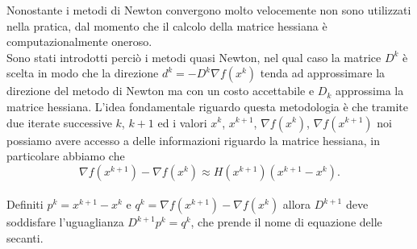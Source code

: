 \documentclass[a4paper, 12pt]{article}
\begin{document}
Nonostante i metodi di Newton convergono molto velocemente non sono utilizzati nella pratica, dal momento che il calcolo della matrice hessiana è computazionalmente oneroso. \\
Sono stati introdotti perciò i metodi quasi Newton, nel qual caso la matrice $D^k$ è scelta in modo che la direzione $d^k = -D^k\nabla f(x^k)$ tenda ad approssimare la direzione del metodo di Newton ma con un costo accettabile e $D_k$ approssima la matrice hessiana. L'idea fondamentale riguardo questa metodologia è che tramite due iterate successive $k$, $k+1$ ed i valori $x^k$, $x^{k+1}$, $\nabla f(x^k)$, $\nabla f(x^{k+1})$ noi possiamo avere accesso a delle informazioni riguardo la matrice hessiana, in particolare abbiamo che\\
\[\nabla f(x^{k+1}) - \nabla f(x^k) \approx H(x^{k+1})(x^{k+1} - x^k).\]\\
Definiti $p^k = x^{k+1} - x^k$ e $q^k = \nabla f(x^{k+1}) - \nabla f(x^k)$ allora $D^{k+1}$ deve soddisfare l'uguaglianza $D^{k+1} p^k = q^k$, che prende il nome di equazione delle secanti.
\end{document}
